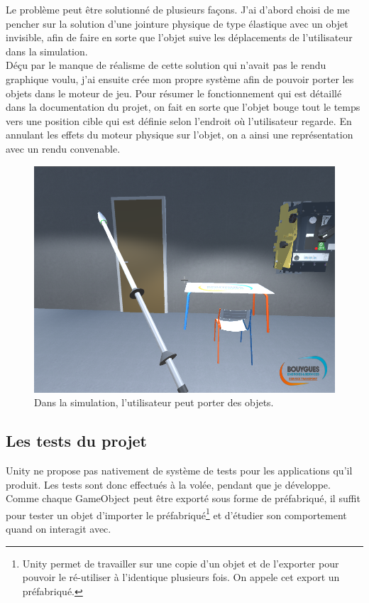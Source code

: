 \documentclass[a4paper]{article}
\begin{document}
    Le problème peut être solutionné de plusieurs façons. J'ai d'abord choisi de me pencher sur la solution d'une jointure physique de type élastique avec un objet invisible, afin de faire en sorte que l'objet suive les déplacements de l'utilisateur dans la simulation. \\

    Déçu par le manque de réalisme de cette solution qui n'avait pas le rendu graphique voulu, j'ai ensuite crée mon propre système afin de pouvoir porter les objets dans le moteur de jeu. Pour résumer le fonctionnement qui est détaillé dans la documentation du projet, on fait en sorte que l'objet bouge tout le temps vers une position cible qui est définie selon l'endroit où l'utilisateur regarde. En annulant les effets du moteur physique sur l'objet, on a ainsi une représentation avec un rendu convenable. \\

    \begin{figure}[H]
        \centering
        \includegraphics[scale=0.5]{img/SimulPorterObjet}
        \caption{Dans la simulation, l'utilisateur peut porter des objets.}
    \end{figure}

    \vfill

    \subsection{Les tests du projet}

    Unity ne propose pas nativement de système de tests pour les applications qu'il produit. Les tests sont donc effectués à la volée, pendant que je développe. Comme chaque GameObject peut être exporté sous forme de préfabriqué, il suffit pour tester un objet d'importer le préfabriqué\footnote{Unity permet de travailler sur une copie d'un objet et de l'exporter pour pouvoir le ré-utiliser à l'identique plusieurs fois. On appele cet export un préfabriqué.} et d'étudier son comportement quand on interagit avec.\\
\end{document}
